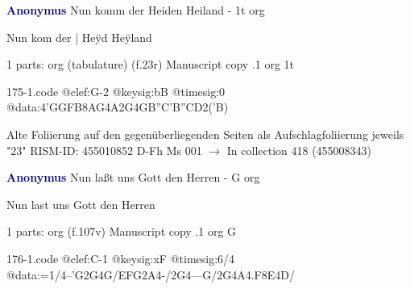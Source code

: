 \documentclass[twocolumn]{book}
\begin{document}
\newline \par \vspace{7pt} \textcolor{darkblue}{\textbf{Anonymus  }}
\newline Nun komm der Heiden Heiland - 1t
\newline org
\newline \begin{itshape}[f.23r, at left:] Nun kom der | Heÿd Heÿland\end{itshape} 
\newline \textcolor{darkblue}{}  1 parts: org (tabulature)  (f.23r)
\newline Manuscript copy
.1  org  1t  
\begin{filecontents*}{175-1.code}
@clef:G-2
@keysig:bB
@timesig:0
@data:4'GGFB{8AG}4A2G4GB''C'B''CD2('B)
\end{filecontents*}
\newline
%

\newline Alte Foliierung auf den gegenüberliegenden Seiten als Aufschlagfoliierung jeweils "23"
\newline RISM-ID: 455010852
\newline D-Fh  Ms 001
\newline $\rightarrow$ In collection 418 (455008343)
      
\newline \par \vspace{7pt} \textcolor{darkblue}{\textbf{Anonymus  }}
\newline Nun laßt uns Gott den Herren - G
\newline org
\newline \begin{itshape}[f.107v, heading:] Nun last uns Gott den Herren\end{itshape} 
\newline \textcolor{darkblue}{}  1 parts: org  (f.107v)
\newline Manuscript copy
.1  org  G  
\begin{filecontents*}{176-1.code}
@clef:C-1
@keysig:xF
@timesig:6/4
@data:=1/4--'G2G4G/EFG2A4-/2G4---G/2G4A4.F8E4D/
\end{filecontents*}
\newline
%
\end{document}
